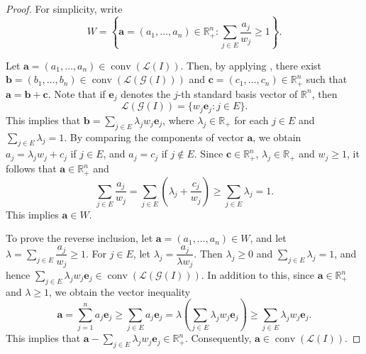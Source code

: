 \documentclass[12pt,reqno]{amsart}
\theoremstyle{definition}
\DeclareMathOperator{\conv}{conv}
\newcommand{\RR}{\mathbb{R}}
\newcommand{\ba}{\mathbf{a}}
\newcommand{\bb}{\mathbf{b}}
\newcommand{\bc}{\mathbf{c}}
\newcommand{\lattice}[1]{\mathcal L(#1)}
\numberwithin{equation}{section}
\begin{document}
\begin{proof}
    For simplicity, write 
    \[W = \left\{ \ba = (a_1, \ldots, a_n) \in \RR_{+}^{n} : \sum_{j \in E} \dfrac{a_j}{w_j} \ge 1 \right\}.\]
   
    Let $\ba = (a_1, \ldots, a_n) \in \conv(\lattice{I}).$ Then, by applying \cite[Lemma 5.2]{CEHH}, there exist
    $\bb = (b_1, \ldots, b_n) \in \conv(\lattice{\mathcal{G}(I)})$ and $\bc = (c_1, \ldots, c_n) \in \RR_{+}^n$ such that $\ba = \bb + \bc.$ Note that if $\mathbf{e}_j$ denotes the $j$-th standard basis vector of $\RR^{n}$, then 
    \[\lattice{\mathcal{G}(I)} = \{w_j\mathbf{e}_j : j \in E\}.\] 
    This implies that $\bb = \sum_{j \in E} \lambda_j w_j \mathbf{e}_j$, where $\lambda_j \in \RR_{+}$ for each $j \in E$ and $\sum_{j \in E} \lambda_j = 1.$ By comparing the components of vector $\ba$, we obtain $a_j = \lambda_j w_j + c_j$ if $j \in E$, and $a_j = c_j$ if $j \notin E.$ Since $\bc \in \RR_{+}^n$, $\lambda_j \in \RR_{+}$ and $w_j \ge 1$, it follows that $\ba \in \RR_{+}^{n}$ and
    \[\sum_{j \in E} \dfrac{a_j}{w_j} = \sum_{j \in E} \left( \lambda_j + \dfrac{c_j}{w_j} \right) \ge \sum_{j \in E} \lambda_j = 1.\]
    This implies $\ba \in W.$  

    To prove the reverse inclusion, let $\ba = (a_1, \ldots, a_n) \in W$, and let $\lambda = \sum_{j \in E} \dfrac{a_j}{w_j} \ge 1.$ For $j \in E$, let $\lambda_j = \dfrac{a_j}{\lambda w_j}.$ Then $\lambda_j \ge 0$ and $\sum_{j \in E} \lambda_j = 1$, and hence $\sum_{j \in E} \lambda_j w_j \mathbf{e}_j \in \conv(\lattice{\mathcal{G}(I)}).$ In addition to this, since $\ba \in \RR_{+}^{n}$ and $\lambda \ge 1$, we obtain the vector inequality
    \[\ba = \sum_{j = 1}^{n} a_j \mathbf{e}_j \ge \sum_{j \in E} a_j \mathbf{e}_j = \lambda\left( \sum_{j \in E} \lambda_j w_j \mathbf{e}_j \right) \ge \sum_{j \in E} \lambda_j w_j \mathbf{e}_j.\] 
    This implies that $\ba - \sum_{j \in E} \lambda_j w_j \mathbf{e}_j \in \RR_{+}^n.$ Consequently, $\ba \in \conv(\lattice{I}).$
\end{proof}
\end{document}
